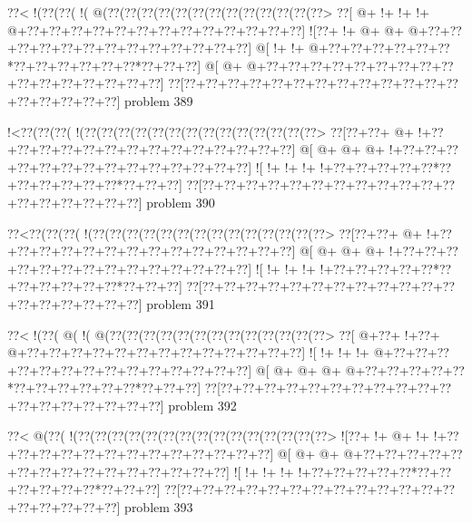 \vbox{\vbox{\goo
\0??<\- !(\0??(\0??(\- !(\- @(\0??(\0??(\0??(\0??(\0??(\0??(\0??(\0??(\0??(\0??(\0??(\0??(\0??>
\0??[\- @+\- !+\- !+\- !+\- @+\0??+\0??+\0??+\0??+\0??+\0??+\0??+\0??+\0??+\0??+\0??+\0??+\0??]
\- ![\0??+\- !+\- @+\- @+\- @+\0??+\0??+\0??+\0??+\0??+\0??+\0??+\0??+\0??+\0??+\0??+\0??+\0??]
\- @[\- !+\- !+\- @+\0??+\0??+\0??+\0??+\0??+\0??*\0??+\0??+\0??+\0??+\0??+\0??*\0??+\0??+\0??]
\- @[\- @+\- @+\0??+\0??+\0??+\0??+\0??+\0??+\0??+\0??+\0??+\0??+\0??+\0??+\0??+\0??+\0??+\0??]
\0??[\0??+\0??+\0??+\0??+\0??+\0??+\0??+\0??+\0??+\0??+\0??+\0??+\0??+\0??+\0??+\0??+\0??+\0??]
}
\hfil problem 389\hfil\break
}



\vbox{\vbox{\goo
\- !<\0??(\0??(\0??(\- !(\0??(\0??(\0??(\0??(\0??(\0??(\0??(\0??(\0??(\0??(\0??(\0??(\0??(\0??>
\0??[\0??+\0??+\- @+\- !+\0??+\0??+\0??+\0??+\0??+\0??+\0??+\0??+\0??+\0??+\0??+\0??+\0??+\0??]
\- @[\- @+\- @+\- @+\- !+\0??+\0??+\0??+\0??+\0??+\0??+\0??+\0??+\0??+\0??+\0??+\0??+\0??+\0??]
\- ![\- !+\- !+\- !+\- !+\0??+\0??+\0??+\0??+\0??*\0??+\0??+\0??+\0??+\0??+\0??*\0??+\0??+\0??]
\0??[\0??+\0??+\0??+\0??+\0??+\0??+\0??+\0??+\0??+\0??+\0??+\0??+\0??+\0??+\0??+\0??+\0??+\0??]
}
\hfil problem 390\hfil\break
}



\vbox{\vbox{\goo
\0??<\0??(\0??(\0??(\- !(\0??(\0??(\0??(\0??(\0??(\0??(\0??(\0??(\0??(\0??(\0??(\0??(\0??(\0??>
\0??[\0??+\0??+\- @+\- !+\0??+\0??+\0??+\0??+\0??+\0??+\0??+\0??+\0??+\0??+\0??+\0??+\0??+\0??]
\- @[\- @+\- @+\- @+\- !+\0??+\0??+\0??+\0??+\0??+\0??+\0??+\0??+\0??+\0??+\0??+\0??+\0??+\0??]
\- ![\- !+\- !+\- !+\- !+\0??+\0??+\0??+\0??+\0??*\0??+\0??+\0??+\0??+\0??+\0??*\0??+\0??+\0??]
\0??[\0??+\0??+\0??+\0??+\0??+\0??+\0??+\0??+\0??+\0??+\0??+\0??+\0??+\0??+\0??+\0??+\0??+\0??]
}
\hfil problem 391\hfil\break
}



\vbox{\vbox{\goo
\0??<\- !(\0??(\- @(\- !(\- @(\0??(\0??(\0??(\0??(\0??(\0??(\0??(\0??(\0??(\0??(\0??(\0??(\0??>
\0??[\- @+\0??+\- !+\0??+\- @+\0??+\0??+\0??+\0??+\0??+\0??+\0??+\0??+\0??+\0??+\0??+\0??+\0??]
\- ![\- !+\- !+\- !+\- @+\0??+\0??+\0??+\0??+\0??+\0??+\0??+\0??+\0??+\0??+\0??+\0??+\0??+\0??]
\- @[\- @+\- @+\- @+\- @+\0??+\0??+\0??+\0??+\0??*\0??+\0??+\0??+\0??+\0??+\0??*\0??+\0??+\0??]
\0??[\0??+\0??+\0??+\0??+\0??+\0??+\0??+\0??+\0??+\0??+\0??+\0??+\0??+\0??+\0??+\0??+\0??+\0??]
}
\hfil problem 392\hfil\break
}



\vbox{\vbox{\goo
\0??<\- @(\0??(\- !(\0??(\0??(\0??(\0??(\0??(\0??(\0??(\0??(\0??(\0??(\0??(\0??(\0??(\0??(\0??>
\- ![\0??+\- !+\- @+\- !+\- !+\0??+\0??+\0??+\0??+\0??+\0??+\0??+\0??+\0??+\0??+\0??+\0??+\0??]
\- @[\- @+\- @+\- @+\0??+\0??+\0??+\0??+\0??+\0??+\0??+\0??+\0??+\0??+\0??+\0??+\0??+\0??+\0??]
\- ![\- !+\- !+\- !+\- !+\0??+\0??+\0??+\0??+\0??*\0??+\0??+\0??+\0??+\0??+\0??*\0??+\0??+\0??]
\0??[\0??+\0??+\0??+\0??+\0??+\0??+\0??+\0??+\0??+\0??+\0??+\0??+\0??+\0??+\0??+\0??+\0??+\0??]
}
\hfil problem 393\hfil\break
}



